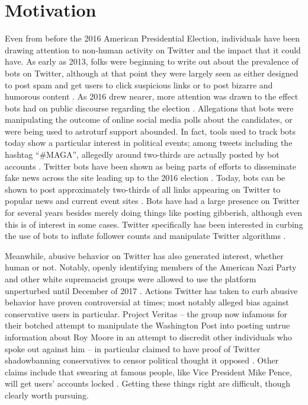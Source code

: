 \documentclass[11pt]{article}
\begin{document}
\section{Motivation}
\label{motivation}
Even from before the 2016 American Presidential Election, individuals have been drawing attention to non-human activity on Twitter and the impact that it could have. As early as 2013, folks were beginning to write out about the prevalence of bots on Twitter, although at that point they were largely seen as either designed to post spam and get users to click suspicious links or to post bizarre and humorous content \cite{bots-humor}. As 2016 drew nearer, more attention was drawn to the effect bots had on public discourse regarding the election \cite{bots-election}. Allegations that bots were manipulating the outcome of online social media polls about the candidates, or were being used to astroturf support abounded. In fact, tools used to track bots today show a particular interest in political events; among tweets including the hashtag ``\#MAGA'', allegedly around two-thirds are actually posted by bot accounts \cite{botcheck}. Twitter bots have been shown as being parts of efforts to disseminate fake news across the site leading up to the 2016 election \cite{anatomy}. Today, bots can be shown to post approximately two-thirds of all links appearing on Twitter to popular news and current event sites \cite{bots-twittersphere}. Bots have had a large presence on Twitter for several years besides merely doing things like posting gibberish, although even this is of interest in some cases. Twitter specifically has been interested in curbing the use of bots to inflate follower counts and manipulate Twitter algorithms \cite{followers-vanish}.

Meanwhile, abusive behavior on Twitter has also generated interest, whether human or not. Notably, openly identifying members of the American Nazi Party and other white supremacist groups were allowed to use the platform unperturbed until December of 2017 \cite{nazis-twitter}. Actions Twitter has taken to curb abusive behavior have proven controversial at times; most notably alleged bias against conservative users in particular. Project Veritas -- the group now infamous for their botched attempt to manipulate the Washington Post into posting untrue information about Roy Moore in an attempt to discredit other individuals who spoke out against him \cite{veritas-failure} -- in particular claimed to have proof of Twitter shadowbanning conservatives to censor political thought it opposed \cite{veritas-claim}. Other claims include that swearing at famous people, like Vice President Mike Pence, will get users' accounts locked \cite{swears}. Getting these things right are difficult, though clearly worth pursuing.
\end{document}
